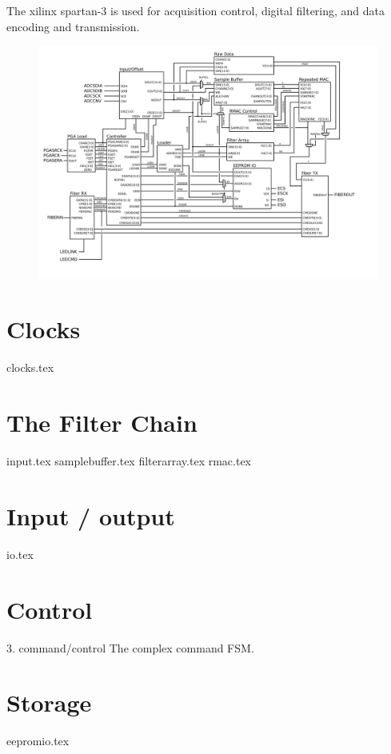 The xilinx spartan-3 is used for acquisition control, digital filtering, and data encoding and transmission. 

\begin{figure}[h!]
\includegraphics[scale=0.7]{FPGA.svg}
\end{figure}

\section{Clocks}
{clocks.tex}

\section{The Filter Chain}
{input.tex}
{samplebuffer.tex}
{filterarray.tex}
{rmac.tex}

\section{Input / output}

{io.tex}

\section{Control}

3. command/control
   The complex command FSM. 

\section{Storage}
{eepromio.tex}

